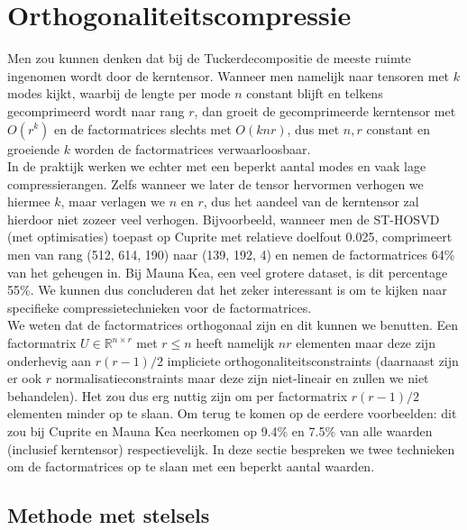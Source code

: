 \section{Orthogonaliteitscompressie}
\label{sec:orthogonaliteitscompressie}

Men zou kunnen denken dat bij de Tuckerdecompositie de meeste ruimte ingenomen wordt door de kerntensor. Wanneer men namelijk naar tensoren met $k$ modes kijkt, waarbij de lengte per mode $n$ constant blijft en telkens gecomprimeerd wordt naar rang $r$, dan groeit de gecomprimeerde kerntensor met $O(r^k)$ en de factormatrices slechts met $O(knr)$, dus met $n, r$ constant en groeiende $k$ worden de factormatrices verwaarloosbaar.\\

In de praktijk werken we echter met een beperkt aantal modes en vaak lage compressierangen. Zelfs wanneer we later de tensor hervormen verhogen we hiermee $k$, maar verlagen we $n$ en $r$, dus het aandeel van de kerntensor zal hierdoor niet zozeer veel verhogen. Bijvoorbeeld, wanneer men de ST-HOSVD (met optimisaties) toepast op Cuprite met relatieve doelfout 0.025, comprimeert men van rang (512, 614, 190) naar (139, 192, 4) en nemen de factormatrices 64\% van het geheugen in. Bij Mauna Kea, een veel grotere dataset, is dit percentage 55\%. We kunnen dus concluderen dat het zeker interessant is om te kijken naar specifieke compressietechnieken voor de factormatrices.\\

We weten dat de factormatrices orthogonaal zijn en dit kunnen we benutten. Een factormatrix $U \in \mathbb{R}^{n \times r}$ met $r \leq n$ heeft namelijk $nr$ elementen maar deze zijn onderhevig aan $r(r - 1)/2$ impliciete orthogonaliteitsconstraints (daarnaast zijn er ook $r$ normalisatieconstraints maar deze zijn niet-lineair en zullen we niet behandelen). Het zou dus erg nuttig zijn om per factormatrix $r(r - 1)/2$ elementen minder op te slaan. Om terug te komen op de eerdere voorbeelden: dit zou bij Cuprite en Mauna Kea neerkomen op 9.4\% en 7.5\% van alle waarden (inclusief kerntensor) respectievelijk. In deze sectie bespreken we twee technieken om de factormatrices op te slaan met een beperkt aantal waarden.

\subsection{Methode met stelsels}
\label{subsec:methode-met-stelsels}

